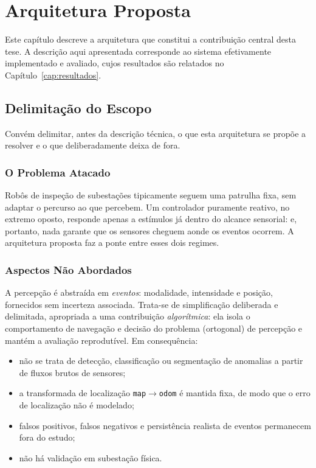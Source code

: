 \chapter[Arquitetura Proposta]{Arquitetura Proposta}
\label{cap:proposta}

Este capítulo descreve a arquitetura que constitui a contribuição central desta
tese. A descrição aqui apresentada corresponde ao sistema efetivamente implementado
e avaliado, cujos resultados são relatados no Capítulo~\ref{cap:resultados}.

\section{Delimitação do Escopo}
\label{sec:prop-escopo}

Convém delimitar, antes da descrição técnica, o que esta arquitetura se propõe a
resolver e o que deliberadamente deixa de fora.

\subsection{O Problema Atacado}

Robôs de inspeção de subestações tipicamente seguem uma patrulha fixa, sem adaptar o
percurso ao que percebem. Um controlador puramente reativo, no extremo oposto,
responde apenas a estímulos já dentro do alcance sensorial: e, portanto, nada
garante que os sensores cheguem aonde os eventos ocorrem. A arquitetura proposta faz
a ponte entre esses dois regimes.

\subsection{Aspectos Não Abordados}
\label{sec:prop-nao-abordado}

A percepção é abstraída em \emph{eventos}: modalidade, intensidade e posição,
fornecidos sem incerteza associada. Trata-se de simplificação deliberada e
delimitada, apropriada a uma contribuição \emph{algorítmica}: ela isola o
comportamento de navegação e decisão do problema (ortogonal) de percepção e mantém a
avaliação reprodutível. Em consequência:

\begin{itemize}
    \item não se trata de detecção, classificação ou segmentação de anomalias a
    partir de fluxos brutos de sensores;
    \item a transformada de localização \texttt{map}$\rightarrow$\texttt{odom} é
    mantida fixa, de modo que o erro de localização não é modelado;
    \item falsos positivos, falsos negativos e persistência realista de eventos
    permanecem fora do estudo;
    \item não há validação em subestação física.
\end{itemize}

